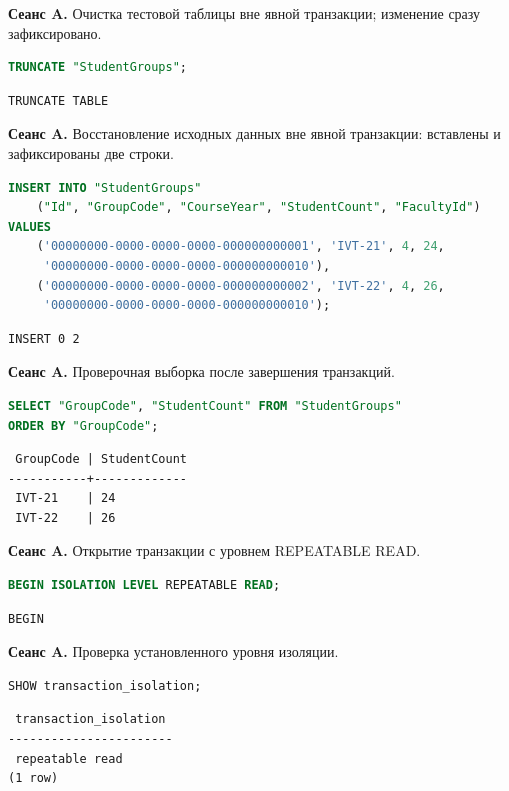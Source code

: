 \documentclass[12pt,a4paper]{article}
\begin{document}
\textbf{Сеанс A.} Очистка тестовой таблицы вне явной транзакции; изменение сразу зафиксировано.
\begin{lstlisting}[language=SQL]
TRUNCATE "StudentGroups";
\end{lstlisting}

\begin{lstlisting}
TRUNCATE TABLE
\end{lstlisting}

\textbf{Сеанс A.} Восстановление исходных данных вне явной транзакции: вставлены и зафиксированы две строки.
\begin{lstlisting}[language=SQL]
INSERT INTO "StudentGroups"
    ("Id", "GroupCode", "CourseYear", "StudentCount", "FacultyId")
VALUES
    ('00000000-0000-0000-0000-000000000001', 'IVT-21', 4, 24,
     '00000000-0000-0000-0000-000000000010'),
    ('00000000-0000-0000-0000-000000000002', 'IVT-22', 4, 26,
     '00000000-0000-0000-0000-000000000010');
\end{lstlisting}

\begin{lstlisting}
INSERT 0 2
\end{lstlisting}

\textbf{Сеанс A.} Проверочная выборка после завершения транзакций.
\begin{lstlisting}[language=SQL]
SELECT "GroupCode", "StudentCount" FROM "StudentGroups"
ORDER BY "GroupCode";
\end{lstlisting}

\begin{lstlisting}
 GroupCode | StudentCount
-----------+-------------
 IVT-21    | 24
 IVT-22    | 26
\end{lstlisting}

\textbf{Сеанс A.} Открытие транзакции с уровнем REPEATABLE READ.
\begin{lstlisting}[language=SQL]
BEGIN ISOLATION LEVEL REPEATABLE READ;
\end{lstlisting}

\begin{lstlisting}
BEGIN
\end{lstlisting}

\textbf{Сеанс A.} Проверка установленного уровня изоляции.
\begin{lstlisting}[language=SQL]
SHOW transaction_isolation;
\end{lstlisting}

\begin{lstlisting}
 transaction_isolation
-----------------------
 repeatable read
(1 row)
\end{lstlisting}
\end{document}
